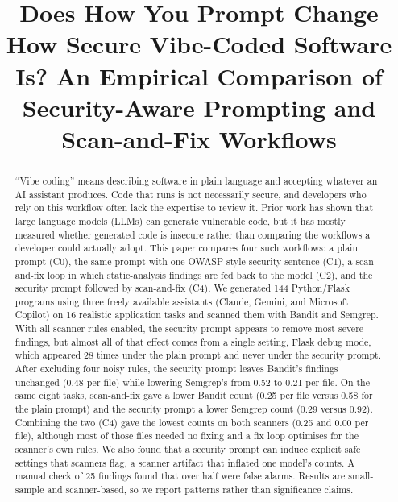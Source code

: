\documentclass[conference]{IEEEtran}
\begin{document}
\title{Does How You Prompt Change How Secure Vibe-Coded Software Is? An Empirical Comparison of Security-Aware Prompting and Scan-and-Fix Workflows}

\author{
}

\maketitle

\begin{abstract}
``Vibe coding'' means describing software in plain language and accepting whatever an AI assistant produces. Code that runs is not necessarily secure, and developers who rely on this workflow often lack the expertise to review it. Prior work has shown that large language models (LLMs) can generate vulnerable code, but it has mostly measured whether generated code is insecure rather than comparing the workflows a developer could actually adopt. This paper compares four such workflows: a plain prompt (C0), the same prompt with one OWASP-style security sentence (C1), a scan-and-fix loop in which static-analysis findings are fed back to the model (C2), and the security prompt followed by scan-and-fix (C4). We generated 144 Python/Flask programs using three freely available assistants (Claude, Gemini, and Microsoft Copilot) on 16 realistic application tasks and scanned them with Bandit and Semgrep. With all scanner rules enabled, the security prompt appears to remove most severe findings, but almost all of that effect comes from a single setting, Flask debug mode, which appeared 28 times under the plain prompt and never under the security prompt. After excluding four noisy rules, the security prompt leaves Bandit's findings unchanged (0.48 per file) while lowering Semgrep's from 0.52 to 0.21 per file. On the same eight tasks, scan-and-fix gave a lower Bandit count (0.25 per file versus 0.58 for the plain prompt) and the security prompt a lower Semgrep count (0.29 versus 0.92). Combining the two (C4) gave the lowest counts on both scanners (0.25 and 0.00 per file), although most of those files needed no fixing and a fix loop optimises for the scanner's own rules. We also found that a security prompt can induce explicit safe settings that scanners flag, a scanner artifact that inflated one model's counts. A manual check of 25 findings found that over half were false alarms. Results are small-sample and scanner-based, so we report patterns rather than significance claims.
\end{abstract}
\end{document}
